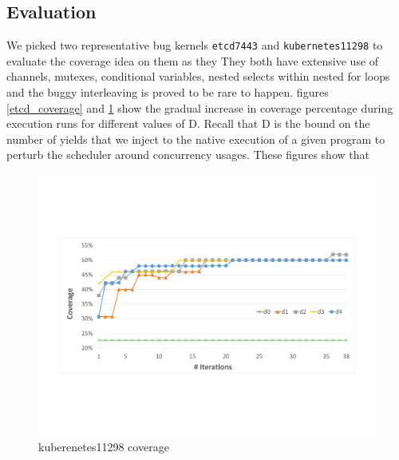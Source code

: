 \subsection{Evaluation}
We picked two representative bug kernels \texttt{etcd7443} and \texttt{kubernetes11298} to evaluate the coverage idea on them as they
%
They both have extensive use of channels, mutexes, conditional variables, nested selects within nested for loops and the buggy interleaving is proved to be rare to happen.
%
figures \ref{etcd_coverage} and \ref{fig:kubernetes_coverage} show the gradual increase in coverage percentage during execution runs for different values of D.
%
Recall that D is the bound on the number of yields that we inject to the native execution of a given program to perturb the scheduler around concurrency usages.
%
These figures show that
%


\begin{figure}
\centering
  \includegraphics[width=.95\linewidth]{figs/coverage_kubernetes11298.pdf}
  \caption{kuberenetes11298 coverage}
  \label{fig:kubernetes_coverage}
\end{figure}
